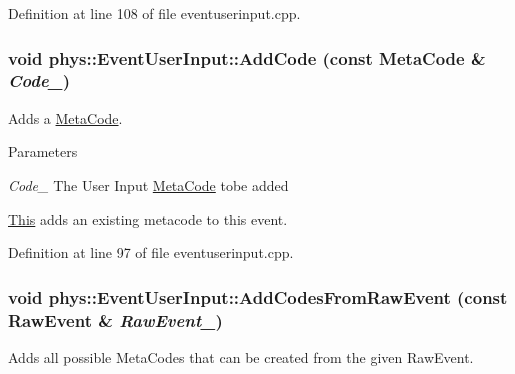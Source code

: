 Definition at line 108 of file eventuserinput.cpp.

\hypertarget{classphys_1_1EventUserInput_a648f820aea2b6bca23eaa3c1e1f54181}{
\subsubsection[{AddCode}]{\setlength{\rightskip}{0pt plus 5cm}void phys::EventUserInput::AddCode (const {\bf MetaCode} \& {\em Code\_\-})}}
\label{d7/df5/classphys_1_1EventUserInput_a648f820aea2b6bca23eaa3c1e1f54181}


Adds a \hyperlink{classphys_1_1MetaCode}{MetaCode}. 


\begin{DoxyParams}{Parameters}
\item[{\em Code\_\-}]The User Input \hyperlink{classphys_1_1MetaCode}{MetaCode} tobe added\end{DoxyParams}
\hyperlink{structThis}{This} adds an existing metacode to this event. 

Definition at line 97 of file eventuserinput.cpp.

\hypertarget{classphys_1_1EventUserInput_a26a39a23deab9e54c140cc0a1cbbe6a9}{
\subsubsection[{AddCodesFromRawEvent}]{\setlength{\rightskip}{0pt plus 5cm}void phys::EventUserInput::AddCodesFromRawEvent (const {\bf RawEvent} \& {\em RawEvent\_\-})}}
\label{d7/df5/classphys_1_1EventUserInput_a26a39a23deab9e54c140cc0a1cbbe6a9}


Adds all possible MetaCodes that can be created from the given RawEvent. 


